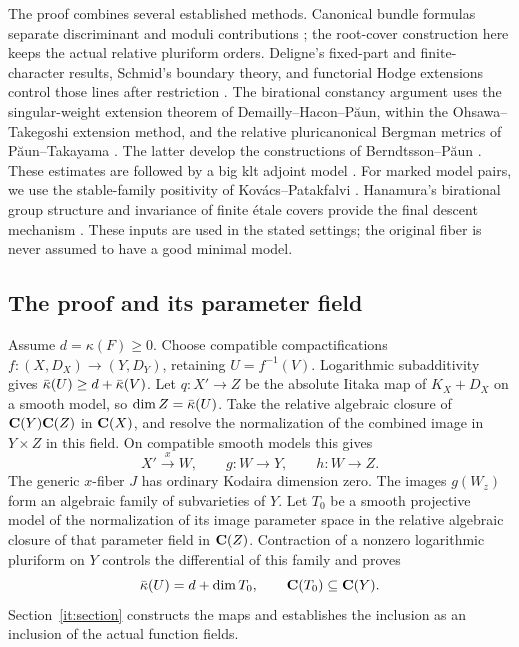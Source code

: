 The proof combines several established methods. Canonical
bundle formulas separate discriminant and moduli contributions
\cite{FujinoMori,AmbroBoundary,AmbroModuli}; the root-cover construction
here keeps the actual relative pluriform orders. Deligne's fixed-part
and finite-character results, Schmid's boundary theory, and functorial
Hodge extensions control those lines after restriction
\cite{Deligne71,Schmid,BFMT}. The birational constancy argument uses the singular-weight extension
theorem of Demailly--Hacon--P\u aun, within the Ohsawa--Takegoshi
extension method, and the relative pluricanonical Bergman metrics of
P\u aun--Takayama \cite{DHP13,PaunTakayama18}. The latter develop
the constructions of Berndtsson--P\u aun
\cite{BerndtssonPaunBergman,BerndtssonPaunSubadjunction}. These
estimates are followed by a big klt adjoint model
\cite{BCHM}. For marked model pairs, we use the stable-family positivity
of Kov\'acs--Patakfalvi \cite{KovacsPatakfalvi}. Hanamura's birational
group structure and invariance of finite \'etale covers provide the
final descent mechanism \cite{Hanamura87,Hanamura88,SGA1,Landesman24}.
These inputs are used in the stated settings; the original fiber is
never assumed to have a good minimal model.

\subsection{The proof and its parameter field}

Assume $d=\kappa(F)\geq0$. Choose compatible compactifications
$f:(X,D_X)\to(Y,D_Y)$, retaining $U=f^{-1}(V)$.
Logarithmic subadditivity gives $\bar\kappa(U)\geq d+\bar\kappa(V)$.
Let $q:X'\to Z$ be the absolute Iitaka map of $K_X+D_X$ on a
smooth model, so $\dim Z=\bar\kappa(U)$. Take the relative algebraic closure of $\mathbf C(Y)\mathbf C(Z)$ in $\mathbf C(X)$,
and resolve the normalization of the combined image in $Y\times Z$
in this field. On compatible smooth models this gives
\[
             X'\xrightarrow{x}W,
       \qquad g:W\to Y,\qquad h:W\to Z.
\]
The generic $x$-fiber $J$ has ordinary Kodaira dimension zero. The
images $g(W_z)$ form an algebraic family of subvarieties of $Y$.
Let $T_0$ be a smooth projective model of the normalization of its
image parameter space in the relative algebraic closure of that
parameter field in $\mathbf C(Z)$. Contraction of a
nonzero logarithmic pluriform on $Y$ controls the differential of this
family and proves
\begin{equation}\label{intro:parameter-dimension}
       \bar\kappa(U)=d+\dim T_0,
       \qquad \mathbf C(T_0)\subseteq\mathbf C(Y).
\end{equation}
Section~\ref{it:section} constructs the maps and establishes the
inclusion as an inclusion of the actual function fields.

